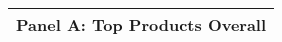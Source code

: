 \documentclass{article}
\begin{document}
\begin{tabular}{lllllll}
\multicolumn{7}{l}{\textbf{Panel A: Top Products Overall}} \\ \midrule

\bottomrule
\end{tabular}
\end{document}
